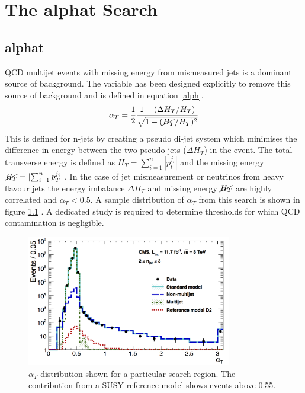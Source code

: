 
\chapter{The alphat Search} %

\label{Chapter3} %



\section{alphat}
QCD multijet events with missing energy from mismeasured jets is a dominant source of background\cite{randall}. The \alphat variable has been designed explicitly to remove this source of background and is defined in equation \ref{alph}.
\begin{equation}
\label{alph}
\alpha_T=\frac{1}{2}\frac{1-(\Delta H_T/H_T)}{\sqrt{1-(\cancel{H_T}/H_T)^2}}
\end{equation}
This is defined for n-jets by creating a pseudo di-jet system which minimises the difference in energy between the two pseudo jets ($\Delta H_T$) in the event. The total transverse energy is defined as $H_T=\sum_{i=1}^n|p_t^{j_i}|$ and the missing energy $\cancel{H_T}=|{\sum_{i=1}^n p_T^{j_i}}|$. In the case of jet mismeasurement or neutrinos from heavy flavour jets the energy imbalance $\Delta H_T$ and missing energy $\cancel{H_T}$ are highly correlated and $\alpha_T<0.5$. A sample distribution of $\alpha_T$ from this search is shown in figure \ref{alphdis} \cite{CMSAT8}. A dedicated study is required to determine \alphat thresholds for which QCD contamination is negligible.
\begin{figure}
\centering
    \includegraphics[width=0.8\textwidth]{Figures/sample_aT.jpg}
  \caption{$\alpha_T$ distribution shown for a particular search region. The contribution from a SUSY reference model shows events above 0.55.}
  \label{alphdis}
\end{figure}

